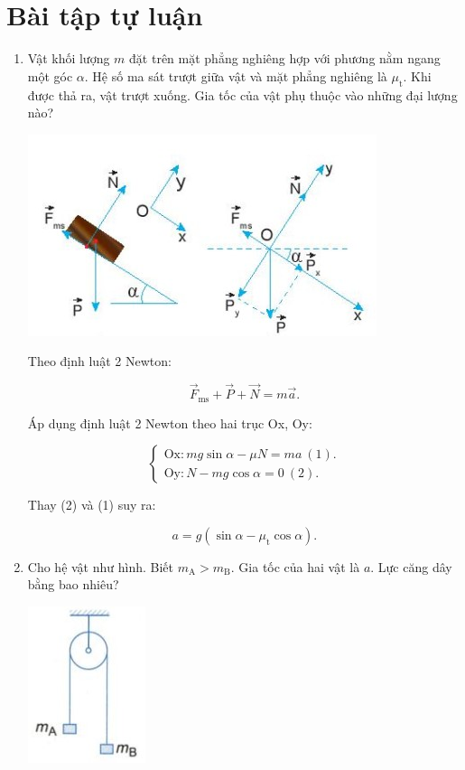 \let\lesson\undefined
\newcommand{\lesson}{\phantomlesson{Bài 12.}}
\setcounter{section}{2}
\section{Bài tập tự luận}
\begin{enumerate}[label=\bfseries Bài \arabic*:,leftmargin=1.5cm]
	\item {}
	
	
	{
		Vật khối lượng $m$ đặt trên mặt phẳng nghiêng hợp với phương nằm ngang một góc $\alpha$. Hệ số ma sát trượt giữa vật và mặt phẳng nghiêng là $\mu_\text{t}$. Khi được thả ra, vật trượt xuống. Gia tốc của vật phụ thuộc vào những đại lượng nào?
		
	}
	
	\hideall
	{
		\begin{center}
			\includegraphics[scale=1]{../figs/VN10-2022-PH-TP021-3.jpg}
		\end{center}
		Theo định luật 2 Newton:
		
		$$ \vec F_\text{ms} + \vec P + \vec N = m\vec a.$$
		
		
		
		Áp dụng định luật 2 Newton theo hai trục Ox, Oy:
		
		$$\begin{cases}
			\text{Ox}:  mg\sin \alpha - \mu N= ma\ (1).\\
			\text{Oy}: 	N - mg\cos \alpha = 0\ (2).
		\end{cases}$$
		
		Thay (2) và (1) suy ra:
		
		$$a = g(\sin \alpha - \mu_\text{t} \cos \alpha).$$
	}
	
	\item {}
	
	
	{Cho hệ vật như hình. Biết $m_\text{A} > m_\text{B}$. Gia tốc của hai vật là $a$. Lực căng dây bằng bao nhiêu?
		\begin{center}
			\includegraphics[scale=1]{../figs/VN10-2022-PH-TP021-22.jpg}
		\end{center}
	}
	

\end{enumerate}
